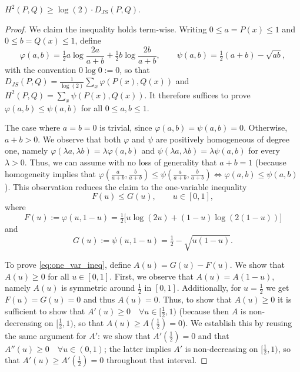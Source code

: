 \documentclass[10pt,a4paper]{amsart}
\begin{document}
\begin{lemma}
\label{lem:hellinger_djs}
$H^{2}(P,Q) \geq \log(2)\cdot D_{JS}(P,Q)$.
\end{lemma}

\begin{proof}
We claim the inequality holds term-wise. Writing $0 \leq a = P(x)\leq 1$ and $0 \leq b = Q(x)\leq 1$, define
\begin{equation}
    \varphi(a,b) = \tfrac{1}{2}a\log\frac{2a}{a+b} + \tfrac{1}{2}b\log\frac{2b}{a+b}, \qquad
    \psi(a,b) = \tfrac{1}{2}(a+b) - \sqrt{ab},
\label{eq:phi_psi_def}
\end{equation}
with the convention $0\log 0 := 0$, so that $D_{JS}(P,Q) = \frac{1}{\log(2)}\sum_x \varphi(P(x),Q(x))$ and $H^{2}(P,Q) = \sum_x \psi(P(x),Q(x))$. It therefore suffices to prove $\varphi(a,b)\leq\psi(a,b)$ for all $0 \leq a,b\leq 1$.
 
The case where $a=b=0$ is trivial, since $\varphi(a,b) = \psi(a,b) = 0$. Otherwise, $a+b > 0$. We observe that both $\varphi$ and $\psi$ are positively homogeneous of degree one, namely $\varphi(\lambda a,\lambda b)=\lambda\varphi(a,b)$ and $\psi(\lambda a,\lambda b)=\lambda\psi(a,b)$ for every $\lambda>0$. Thus, we can assume with no loss of generality that $a+b=1$ (because homogeneity implies that $\varphi(\frac{a}{a+b},\frac{b}{a+b})\leq\psi(\frac{a}{a+b},\frac{b}{a+b}) \iff \varphi(a,b)\leq\psi(a,b)$). This observation reduces the claim to the one-variable inequality
\begin{equation}
    F(u) \leq G(u), \qquad u\in[0,1],
\label{eq:one_var_ineq}
\end{equation}
where
\begin{equation}
    F(u) := \varphi(u,1-u)  = \tfrac{1}{2}\big[u\log(2u) + (1-u)\log(2(1-u))\big]
\label{eq:F_def}
\end{equation}
and
\begin{equation}
    G(u) := \psi(u, 1-u) = \tfrac{1}{2} - \sqrt{u(1-u)}.
\label{eq:G_def}
\end{equation}
 
To prove \eqref{eq:one_var_ineq}, define $A(u) = G(u) - F(u)$. We show that $A(u)\geq 0$ for all $u\in[0,1]$.
First, we observe that $A(u)=A(1-u)$, namely $A(u)$ is symmetric around $\tfrac{1}{2}$ in $[0,1]$. Additionally, for $u=\tfrac{1}{2}$ we get $F(u)=G(u)=0$ and thus $A(u)=0$. Thus, to show that $A(u)\geq 0$ it is sufficient to show that $A'(u)\geq0 \quad \forall u\in[\tfrac{1}{2},1)$ (because then $A$ is non-decreasing on $[\tfrac{1}{2},1)$, so that $A(u)\geq A(\tfrac{1}{2})=0$). We establish this by reusing the same argument for $A'$: we show that $A'(\tfrac{1}{2})=0$ and that $A''(u) \geq 0 \quad \forall u\in(0,1)$; the latter implies $A'$ is non-decreasing on $[\tfrac{1}{2},1)$, so that $A'(u)\geq A'(\tfrac{1}{2})=0$ throughout that interval.
 

\end{proof}
\end{document}
